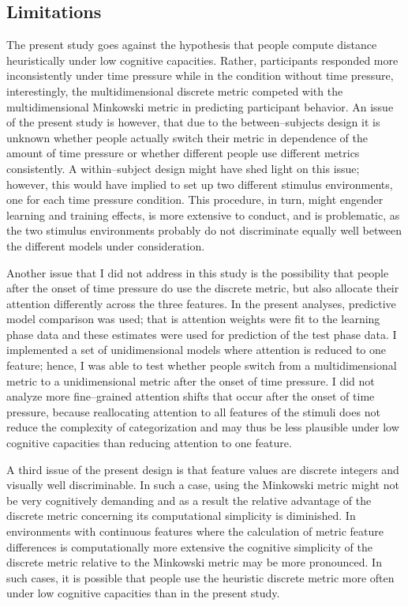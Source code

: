 \documentclass[a4paper,man,natbib]{apa6}
\begin{document}
\subsection{Limitations}
The present study goes against the hypothesis that people compute distance heuristically under low cognitive capacities. Rather, participants responded more inconsistently under time pressure while in the condition without time pressure, interestingly, the multidimensional discrete metric competed with the multidimensional Minkowski metric in predicting participant behavior. An issue of the present study is however, that due to the between--subjects design it is unknown whether people actually switch their metric in dependence of the amount of time pressure or whether different people use different metrics consistently. A within--subject design might have shed light on this issue; however, this would have implied to set up two different stimulus environments, one for each time pressure condition. This procedure, in turn, might engender learning and training effects, is more extensive to conduct, and is problematic, as the two stimulus environments probably do not discriminate equally well between the different models under consideration.

Another issue that I did not address in this study is the possibility that people after the onset of time pressure do use the discrete metric, but also allocate their attention differently across the three features. In the present analyses, predictive model comparison was used; that is attention weights were fit to the learning phase data and these estimates were used for prediction of the test phase data. I implemented a set of unidimensional models where attention is reduced to one feature; hence, I was able to test whether people switch from a multidimensional metric to a unidimensional metric after the onset of time pressure. I did not analyze more fine--grained attention shifts that occur after the onset of time pressure, because reallocating attention to all features of the stimuli does not reduce the complexity of categorization and may thus be less plausible under low cognitive capacities than reducing attention to one feature. 

A third issue of the present design is that feature values are discrete integers and visually well discriminable. In such a case, using the Minkowski metric might not be very cognitively demanding and as a result the relative advantage of the discrete metric concerning its computational simplicity is diminished. In environments with continuous features where the calculation of metric feature differences is computationally more extensive the cognitive simplicity of the discrete metric relative to the Minkowski metric may be more pronounced. In such cases, it is possible that people use the heuristic discrete metric more often under low cognitive capacities than in the present study.
\end{document}
